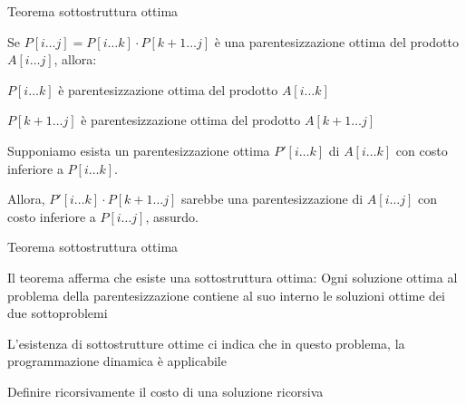 \begin{frame}{Teorema sottostruttura ottima}

\vspace{-9pt}
\begin{myboxtitle}[Teorema]
\alert{Se} $P[i \ldots j] =  P[i \ldots k]  \cdot P[k+1 \ldots j]$ è una parentesizzazione ottima del prodotto $A[i \ldots j]$, \alert{allora}:
\BI
\item $P[i \ldots k]$ è parentesizzazione ottima del prodotto $A[i \ldots k]$
\item $P[k+1 \ldots j]$ è parentesizzazione ottima del prodotto $A[k+1 \ldots j]$
\EI
\end{myboxtitle}

\begin{myboxtitle}
\BIL
\item Supponiamo esista un parentesizzazione ottima $P'[i \ldots k]$ di $A[i \ldots k]$ con costo inferiore a $P[i \ldots k]$.
\item Allora, $P'[i \ldots k] \cdot P[k+1 \ldots j]$ sarebbe una parentesizzazione di $A[i \ldots j]$ con costo inferiore a $P[i \ldots j]$, assurdo.
\EIL
\end{myboxtitle}

\end{frame}

\begin{frame}{Teorema sottostruttura ottima}

\vspace{-9pt}
\begin{myboxtitle}
Il teorema afferma che esiste una \alert{sottostruttura ottima}: Ogni soluzione ottima al problema della parentesizzazione contiene al suo interno le soluzioni ottime dei due sottoproblemi
\end{myboxtitle}


\begin{myboxtitle}
L'esistenza di sottostrutture ottime ci indica che in questo problema, la programmazione dinamica è applicabile
\end{myboxtitle}

\begin{myboxtitle}
Definire ricorsivamente il costo di una soluzione ricorsiva
\end{myboxtitle}


\end{frame}

